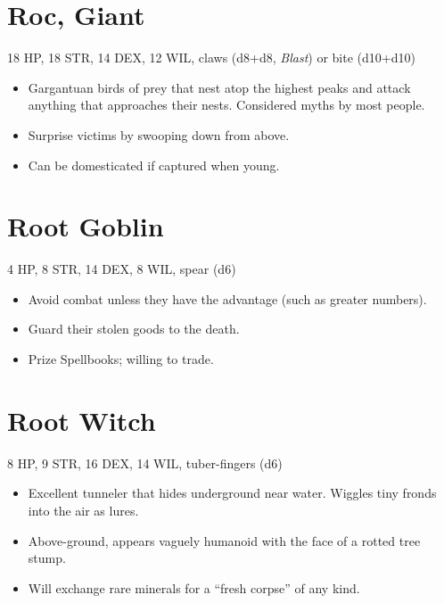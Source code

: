 \documentclass[
  10pt,
  american,
]{article}
\begin{document}
\hypertarget{roc-giant}{%
\section{Roc, Giant}\label{roc-giant}}

18 HP, 18 STR, 14 DEX, 12 WIL, claws (d8+d8, \emph{Blast}) or bite
(d10+d10)

\begin{samepage}
\begin{itemize}
\setlength\itemsep{-.5em}
\item Gargantuan birds of prey that nest atop the highest peaks and attack anything that approaches their nests. Considered myths by most people.
\item Surprise victims by swooping down from above.
\item Can be domesticated if captured when young.
\end{itemize}
\end{samepage}

\hypertarget{root-goblin}{%
\section{Root Goblin}\label{root-goblin}}

4 HP, 8 STR, 14 DEX, 8 WIL, spear (d6)

\begin{samepage}
\begin{itemize}
\setlength\itemsep{-.5em}
\item Avoid combat unless they have the advantage (such as greater numbers).
\item Guard their stolen goods to the death.
\item Prize Spellbooks; willing to trade.
\end{itemize}
\end{samepage}

\hypertarget{root-witch}{%
\section{Root Witch}\label{root-witch}}

8 HP, 9 STR, 16 DEX, 14 WIL, tuber-fingers (d6)

\begin{samepage}
\begin{itemize}
\setlength\itemsep{-.5em}
\item Excellent tunneler that hides underground near water. Wiggles tiny fronds into the air as lures.
\item Above-ground, appears vaguely humanoid with the face of a rotted tree stump.
\item Will exchange rare minerals for a “fresh corpse” of any kind.
\end{itemize}
\end{samepage}
\end{document}
